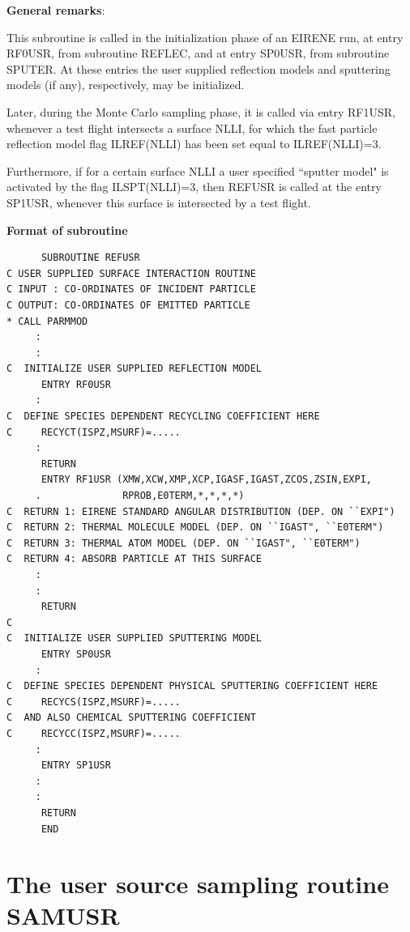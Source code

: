 \medskip

\noindent

{\bf General remarks}:

\medskip

\noindent

This subroutine is called in the initialization phase of an EIRENE
run, at entry RF0USR, from subroutine REFLEC, and at entry SP0USR, from
subroutine SPUTER. At these entries the user supplied reflection models
and sputtering models (if any),
respectively, may be initialized.

Later, during the Monte
Carlo sampling phase, it is called via entry RF1USR, whenever a test
flight intersects a surface NLLI, for which the fast particle reflection
model flag ILREF(NLLI) has been set equal to ILREF(NLLI)=3.

Furthermore, if
for a certain surface NLLI a user specified ``sputter model" is activated
by the flag ILSPT(NLLI)=3,
then REFUSR is called at the entry SP1USR,
whenever this surface is intersected by a test flight.

\medskip

\noindent

{\bf Format of subroutine}

\medskip

\noindent

\begin{verbatim}
      SUBROUTINE REFUSR
C USER SUPPLIED SURFACE INTERACTION ROUTINE
C INPUT : CO-ORDINATES OF INCIDENT PARTICLE
C OUTPUT: CO-ORDINATES OF EMITTED PARTICLE
* CALL PARMMOD
     :
     :
C  INITIALIZE USER SUPPLIED REFLECTION MODEL
      ENTRY RF0USR
     :
C  DEFINE SPECIES DEPENDENT RECYCLING COEFFICIENT HERE
C     RECYCT(ISPZ,MSURF)=.....
     :
      RETURN
      ENTRY RF1USR (XMW,XCW,XMP,XCP,IGASF,IGAST,ZCOS,ZSIN,EXPI,
     .              RPROB,E0TERM,*,*,*,*)
C  RETURN 1: EIRENE STANDARD ANGULAR DISTRIBUTION (DEP. ON ``EXPI")
C  RETURN 2: THERMAL MOLECULE MODEL (DEP. ON ``IGAST", ``E0TERM")
C  RETURN 3: THERMAL ATOM MODEL (DEP. ON ``IGAST", ``E0TERM")
C  RETURN 4: ABSORB PARTICLE AT THIS SURFACE
     :
     :
      RETURN
C
C  INITIALIZE USER SUPPLIED SPUTTERING MODEL
      ENTRY SP0USR
     :
C  DEFINE SPECIES DEPENDENT PHYSICAL SPUTTERING COEFFICIENT HERE
C     RECYCS(ISPZ,MSURF)=.....
C  AND ALSO CHEMICAL SPUTTERING COEFFICIENT
C     RECYCC(ISPZ,MSURF)=.....
     :
      ENTRY SP1USR
     :
     :
      RETURN
      END
\end{verbatim}
\newpage

\section{The user source sampling routine SAMUSR} \label{sec3.4}

